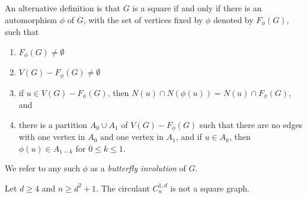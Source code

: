 \documentclass[10pt,a4paper]{amsart}
\begin{document}
\begin{observation} \label{obs:alt-defn} 
An alternative definition is that $G$ is a square  if and only if there is an automorphism $\phi$ of $G$, with the set of vertices fixed by $\phi$ denoted by $F_{\phi}(G)$, such that 
\begin{enumerate} 
\item $F_{\phi}(G)\neq \emptyset$
\item $V(G)-F_{\phi}(G)\neq \emptyset$
\item if $u\in V(G)-F_{\phi}(G)$, then $N(u)\cap N(\phi(u))=N(u)\cap F_{\phi}(G)$, and 
\item there is a partition $A_0\cup A_1$ of $V(G)-F_{\phi}(G)$ such that there are no edges with one vertex in $A_0$ and one vertex in $A_1$, and if $u\in A_k$, then $\phi(u) \in A_{1-k}$ for $0 \leq k \leq 1$.
\end{enumerate} 

We refer to any such $\phi$ as a \textit{butterfly involution} of $G$.  
\end{observation}

\begin{theorem} \label{thm:circ-1-d} Let $d\geq 4$ and $n\geq d^2+1$.  The circulant $C_{n}^{1,d}$ is not a square graph. 
\end{theorem}
\end{document}
